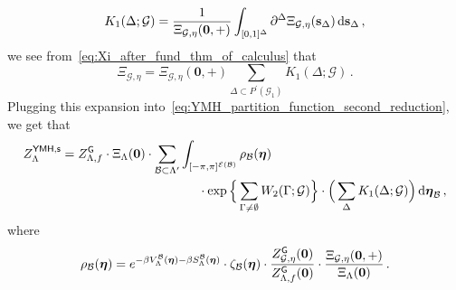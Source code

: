 \documentclass[11pt]{article}
\theoremstyle{definition}
\theoremstyle{remark}
\numberwithin{theorem}{section}
\def\Ga{{\Gamma}}
\newcommand{\cE}{\mathcal{E}}
\begin{document}
    \begin{equation}
    \label{eq:def_of_K_1}
        K_1(\Delta;\mathcal{G}) = \frac{1}{\Xi_{\mathcal{G},\eta}(\mathbf{0},+)} \int_{[0,1]^\Delta} \partial^\Delta \Xi_{\mathcal{G},\eta}(\mathbf{s}_{\Delta}) \, {\rm d} \mathbf{s}_\Delta \, ,
    \end{equation}
    we see from~\eqref{eq:Xi_after_fund_thm_of_calculus} that
    \begin{equation*}
         \Xi_{\mathcal{G},\eta} = \Xi_{\mathcal{G},\eta}(\mathbf{0},+) \sum_{\Delta\subset P^\prime(\mathcal{G}_1)} K_1(\Delta;\mathcal{G}) \, . 
    \end{equation*}    
    Plugging this expansion into~\eqref{eq:YMH_partition_function_second_reduction}, we get that
    \begin{align}
        \label{eq:YMH_partition_function_third_reduction}
        Z_{\Lambda}^{\sf YMH,s}  &=   Z_{\Lambda,f}^{\sf G} \cdot \Xi_{\Lambda}(\mathbf{0}) \cdot \sum_{\mathcal{B}\subset \Lambda^\prime } \int_{[-\pi,\pi]^{\cE(\mathcal{B})}} \rho_{\mathcal{B}}(\boldsymbol{\eta}) \notag \\
        &\hskip1.5in \cdot   \exp\Big\{ \sum_{\Ga\not=\emptyset} W_2(\Ga;\mathcal{G}) \Big\} \cdot \Big(\sum_{\Delta} K_1(\Delta;\mathcal{G}) \Big)\,  {\rm d}\boldsymbol{\eta}_{\mathcal{B}} \, ,
    \end{align}
    where
    \begin{equation}
        \label{eq:def_of_rho_B}
        \rho_{\mathcal{B}}(\boldsymbol{\eta}) = e^{-\beta V_{\Lambda}^{\mathcal{B}}(\boldsymbol{\eta})- \beta S_{\Lambda}^{\mathcal{B}}(\boldsymbol{\eta})} \cdot \zeta_{\mathcal{B}}(\boldsymbol{\eta}) \cdot \frac{Z_{\mathcal{G},\eta}^{\sf G}(\mathbf{0})}{Z_{\Lambda,f}^{\sf G}(\mathbf{0})} \cdot \frac{\Xi_{\mathcal{G},\eta}(\mathbf{0},+)}{\Xi_{\Lambda}(\mathbf{0})} \, .
    \end{equation}
\end{document}
